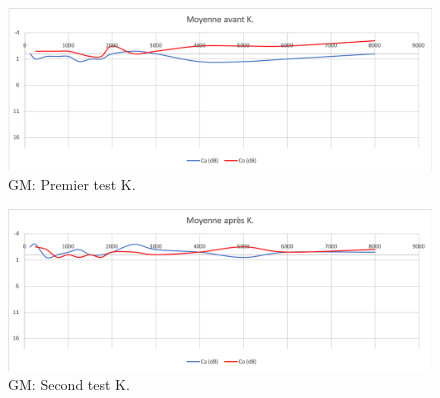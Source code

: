  
 \begin{figure}[th]
 	\centering
 	\includegraphics[width=0.7\linewidth]{images/graphiques/kad_pre.png}
 	\caption[GM: Patient K. . 1° test]{GM: Premier test K.}
 	
 	
 \end{figure}
 
 
 \begin{figure}[th]
 	\centering
 	\includegraphics[width=0.7\linewidth]{images/graphiques/kad_post.png}
 	\caption[GM: Patient K. : 2° test]{GM: Second test K.}
 	
 \end{figure}



 	
 	
 	
 
%                                 
                                 
  
